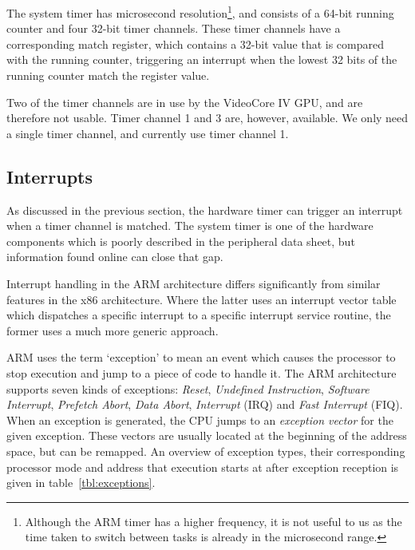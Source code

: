 \documentclass[twoside]{uva-inf-bachelor-thesis}
\begin{document}
The system timer has microsecond resolution\footnote{Although the ARM timer has a higher frequency, it is not useful to us as the time taken to switch between tasks is already in the microsecond range.}, and consists of a 64-bit running counter and four 32-bit timer channels. These timer channels have a corresponding match register, which contains a 32-bit value that is compared with the running counter, triggering an interrupt when the lowest 32 bits of the running counter match the register value.

Two of the timer channels are in use by the VideoCore IV GPU, and are therefore not usable. Timer channel 1 and 3 are, however, available. We only need a single timer channel, and currently use timer channel 1.

\subsection{Interrupts}
As discussed in the previous section, the hardware timer can trigger an interrupt when a timer channel is matched. The system timer is one of the hardware components which is poorly described in the peripheral data sheet, but information found online can close that gap.

Interrupt handling in the ARM architecture differs significantly from similar features in the x86 architecture. Where the latter uses an interrupt vector table which dispatches a specific interrupt to a specific interrupt service routine, the former uses a much more generic approach.

ARM uses the term `exception' to mean an event which causes the processor to stop execution and jump to a piece of code to handle it. The ARM architecture supports seven kinds of exceptions: \textit{Reset}, \textit{Undefined Instruction}, \textit{Software Interrupt}, \textit{Prefetch Abort}, \textit{Data Abort}, \textit{Interrupt} (IRQ) and \textit{Fast Interrupt} (FIQ). When an exception is generated, the CPU jumps to an \textit{exception vector} for the given exception. These vectors are usually located at the beginning of the address space, but can be remapped. An overview of exception types, their corresponding processor mode and address that execution starts at after exception reception is given in table~\ref{tbl:exceptions}.
\end{document}
